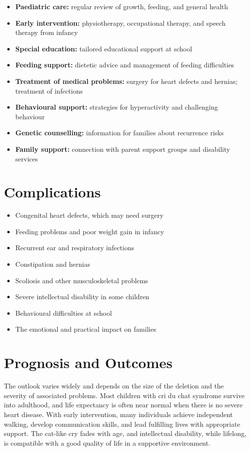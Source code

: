 \begin{itemize}
    \item \textbf{Paediatric care:} regular review of growth, feeding, and general health
    \item \textbf{Early intervention:} physiotherapy, occupational therapy, and speech therapy from infancy
    \item \textbf{Special education:} tailored educational support at school
    \item \textbf{Feeding support:} dietetic advice and management of feeding difficulties
    \item \textbf{Treatment of medical problems:} surgery for heart defects and hernias; treatment of infections
    \item \textbf{Behavioural support:} strategies for hyperactivity and challenging behaviour
    \item \textbf{Genetic counselling:} information for families about recurrence risks
    \item \textbf{Family support:} connection with parent support groups and disability services
\end{itemize}

\section*{Complications}
\begin{itemize}
    \item Congenital heart defects, which may need surgery
    \item Feeding problems and poor weight gain in infancy
    \item Recurrent ear and respiratory infections
    \item Constipation and hernias
    \item Scoliosis and other musculoskeletal problems
    \item Severe intellectual disability in some children
    \item Behavioural difficulties at school
    \item The emotional and practical impact on families
\end{itemize}

\section*{Prognosis and Outcomes}
The outlook varies widely and depends on the size of the deletion and the severity of associated problems. Most children with cri du chat syndrome survive into adulthood, and life expectancy is often near normal when there is no severe heart disease. With early intervention, many individuals achieve independent walking, develop communication skills, and lead fulfilling lives with appropriate support. The cat-like cry fades with age, and intellectual disability, while lifelong, is compatible with a good quality of life in a supportive environment.

